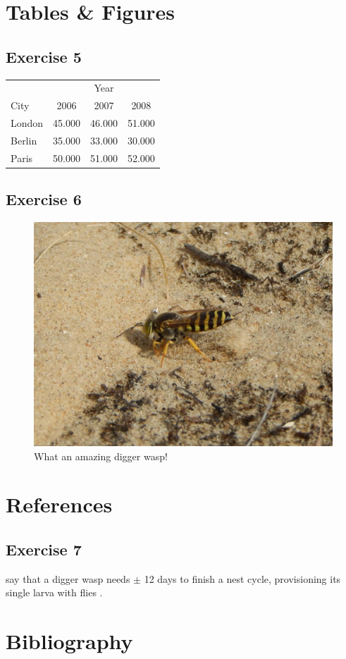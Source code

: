 \documentclass[a4paper,12pt]{article}
\begin{document}
\section{Tables \& Figures}
\subsection{Exercise 5}
\begin{table}[h]
	\begin{tabular}{l|c c c}
		 & & Year & \\
		 \cline{2-4}
		City & 2006 & 2007 & 2008\\
		\hline
		London & 45.000 & 46.000 & 51.000\\
		Berlin & 35.000 & 33.000 & 30.000\\
		Paris & 50.000 & 51.000 & 52.000\\
	\end{tabular}	
\end{table}

\subsection{Exercise 6}
\begin{figure}[ht]
	\centering
	\includegraphics[height=0.5\textwidth]{DiggerWasp.jpg}
	\caption{What an amazing digger wasp!}\label{fig:diggerwasp}
\end{figure}

\section{References}
\subsection{Exercise 7}
\citeauthor{Tengo1996} say that a digger wasp needs $\pm$ 12 days to finish a nest cycle, provisioning its single larva with flies \citep{Nielsen1945}.

\section{Bibliography}



\end{document}
